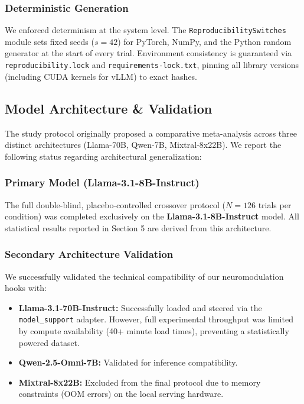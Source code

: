 \documentclass[10pt, twocolumn]{article}
\begin{document}
\subsubsection{Deterministic Generation}
We enforced determinism at the system level. The \texttt{ReproducibilitySwitches} module sets fixed seeds ($s=42$) for PyTorch, NumPy, and the Python random generator at the start of every trial. Environment consistency is guaranteed via \texttt{reproducibility.lock} and \texttt{requirements-lock.txt}, pinning all library versions (including CUDA kernels for vLLM) to exact hashes.

\subsection{Model Architecture \& Validation}
The study protocol originally proposed a comparative meta-analysis across three distinct architectures (Llama-70B, Qwen-7B, Mixtral-8x22B). We report the following status regarding architectural generalization:

\subsubsection{Primary Model (Llama-3.1-8B-Instruct)}
The full double-blind, placebo-controlled crossover protocol ($N=126$ trials per condition) was completed exclusively on the \textbf{Llama-3.1-8B-Instruct} model. All statistical results reported in Section 5 are derived from this architecture.

\subsubsection{Secondary Architecture Validation}
We successfully validated the technical compatibility of our neuromodulation hooks with:
\begin{itemize}
    \item \textbf{Llama-3.1-70B-Instruct:} Successfully loaded and steered via the \texttt{model\_support} adapter. However, full experimental throughput was limited by compute availability (40+ minute load times), preventing a statistically powered dataset.
    \item \textbf{Qwen-2.5-Omni-7B:} Validated for inference compatibility.
    \item \textbf{Mixtral-8x22B:} Excluded from the final protocol due to memory constraints (OOM errors) on the local serving hardware.
\end{itemize}
\end{document}
